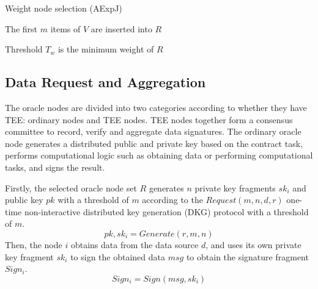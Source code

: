 \documentclass[paper]{ieice}
\begin{document}
 \begin{algorithm}[h!]
    \caption{Weight node selection (AExpJ)}
    \label{algorithm:wrs}
    
    \LinesNumbered
    
    The first $m$ items of $V$ are inserted into $R$

    
    Threshold $T_w$ is the minimum weight of $R$
    
\end{algorithm}

\subsection{Data Request and Aggregation}

The oracle nodes are divided into two categories according to whether they have TEE: ordinary nodes and TEE nodes. TEE nodes together form a consensus committee to record, verify and aggregate data signatures. The ordinary oracle node generates a distributed public and private key based on the contract task, performs computational logic such as obtaining data or performing computational tasks, and signs the result.

Firstly, the selected oracle node set $R$ generates $n$ private key fragments $sk_i$ and public key $pk$ with a threshold of $m$ according to the $Request(m,n,d,r)$ one-time non-interactive distributed key generation (DKG) protocol  \cite{hanke2018dfinity} with a threshold of $m$.
 \begin{equation}
    pk,sk_i = Generate(r,m,n)
\end{equation}
Then, the node $i$ obtains data from the data source $d$, and uses its own private key fragment $sk_i$ to sign the obtained data $msg$ to obtain the signature fragment $Sign_i$.
\begin{equation}
    Sign_i = Sign(msg,sk_i)
\end{equation}
\end{document}
